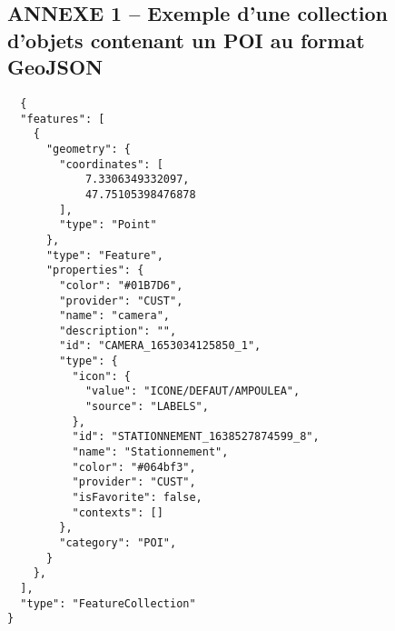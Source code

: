\documentclass{rapportUHA40}
\begin{document}
\subsection*{\hypertarget{ANNEX1}{ANNEXE 1 – Exemple d'une collection d'objets contenant un POI au format GeoJSON}}
\begin{verbatim}
  {
  "features": [
    {
      "geometry": {
        "coordinates": [
            7.3306349332097,
            47.75105398476878
        ],
        "type": "Point"
      },
      "type": "Feature",
      "properties": {
        "color": "#01B7D6",
        "provider": "CUST",
        "name": "camera",
        "description": "",
        "id": "CAMERA_1653034125850_1",
        "type": {
          "icon": {
            "value": "ICONE/DEFAUT/AMPOULEA",
            "source": "LABELS",
          },
          "id": "STATIONNEMENT_1638527874599_8",
          "name": "Stationnement",
          "color": "#064bf3",
          "provider": "CUST",
          "isFavorite": false,
          "contexts": []
        },
        "category": "POI",
      }
    },
  ],
  "type": "FeatureCollection"
}
\end{verbatim}

\clearpage



\end{document}
